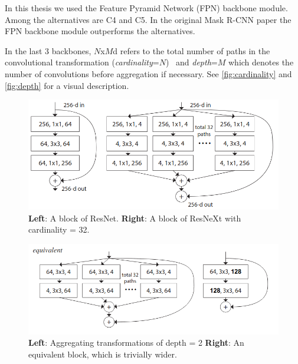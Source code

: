 \documentclass[oneside, english, bibtex]{kththesis}
\begin{document}
In this thesis we used the Feature Pyramid Network (FPN) backbone module. Among the alternatives are C4 and C5. In the original Mask R-CNN paper the FPN backbone module outperforms the alternatives. 


In the last 3 backbones, $N$x$M$d refers to the total number of paths in the convolutional transformation (\textit{cardinality}=$N$)~\cite{DBLP:journals/corr/XieGDTH16} and \textit{depth}=$M$ which denotes the number of convolutions before aggregation if necessary. See \autoref{fig:cardinality} and \autoref{fig:depth} for a visual description.

\begin{figure}[H]
  \begin{center}
    \includegraphics[width=1.0\textwidth]{figures/resnext-cardinality.png}
  \end{center}
  \caption{\textbf{Left}: A block of ResNet. \textbf{Right}: A block of ResNeXt with cardinality = 32. ~\cite{DBLP:journals/corr/XieGDTH16}}
  \label{fig:cardinality}
\end{figure}

\begin{figure}[H]
  \begin{center}
    \includegraphics[width=1.0\textwidth]{figures/resnext-depth.png}
  \end{center}
  \caption{\textbf{Left}: Aggregating transformations of depth = 2 \textbf{Right}: An equivalent block, which is trivially wider.~\cite{DBLP:journals/corr/XieGDTH16}}
  \label{fig:depth}
\end{figure}
\end{document}
